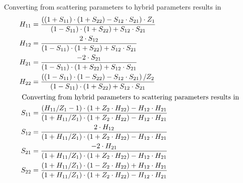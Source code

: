 \documentclass[10pt]{report}
\begin{document}
Converting from scattering parameters to hybrid parameters results in
\begin{align}
H_{11} &= \dfrac{\left(\left(1 + S_{11}\right)\cdot \left(1 + S_{22}\right) - S_{12}\cdot S_{21}\right)\cdot Z_{1}}{\left(1 - S_{11}\right)\cdot \left(1 + S_{22}\right) + S_{12}\cdot S_{21}}\\
H_{12} &= \dfrac{2\cdot S_{12}}{\left(1 - S_{11}\right)\cdot \left(1 + S_{22}\right) + S_{12}\cdot S_{21}}\\
H_{21} &= \dfrac{-2\cdot S_{21}}{\left(1 - S_{11}\right)\cdot \left(1 + S_{22}\right) + S_{12}\cdot S_{21}}\\
H_{22} &= \dfrac{\left(\left(1 - S_{11}\right)\cdot \left(1 - S_{22}\right) - S_{12}\cdot S_{21}\right) / Z_{2}}{\left(1 - S_{11}\right)\cdot \left(1 + S_{22}\right) + S_{12}\cdot S_{21}}\\
\intertext{
Converting from hybrid parameters to scattering parameters results in
}
S_{11} &= \dfrac{\left(H_{11} / Z_{1} - 1\right)\cdot \left(1 + Z_{2}\cdot H_{22}\right) - H_{12}\cdot H_{21}}{\left(1 + H_{11} / Z_{1}\right)\cdot \left(1 + Z_{2}\cdot H_{22}\right) - H_{12}\cdot H_{21}}\\
S_{12} &= \dfrac{2\cdot H_{12}}{\left(1 + H_{11} / Z_{1}\right)\cdot \left(1 + Z_{2}\cdot H_{22}\right) - H_{12}\cdot H_{21}}\\
S_{21} &= \dfrac{-2\cdot H_{21}}{\left(1 + H_{11} / Z_{1}\right)\cdot \left(1 + Z_{2}\cdot H_{22}\right) - H_{12}\cdot H_{21}}\\
S_{22} &= \dfrac{\left(1 + H_{11} / Z_{1}\right)\cdot \left(1 - Z_{2}\cdot H_{22}\right) + H_{12}\cdot H_{21}}{\left(1 + H_{11} / Z_{1}\right)\cdot \left(1 + Z_{2}\cdot H_{22}\right) - H_{12}\cdot H_{21}}
\end{align}
\end{document}
